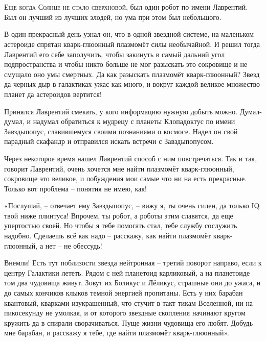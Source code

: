 \documentclass[ebook,oneside,final,openright]{memoir}
\begin{document}
\chapter{}
 \lettrine{Е}{ще когда Солнце не стало сверхновой,} был один робот по имени Лаврентий. Был он лучший из лучших злодей, но ума при этом был небольшого.\par
\par
В один прекрасный день узнал он, что в одной звездной системе, на маленьком астероиде спрятан кварк-глюонный плазмомёт силы необычайной. И решил тогда Лаврентий его себе заполучить, чтобы закинуть в самый дальний угол подпространства и чтобы никто больше не мог разыскать это сокровище и не смущало оно умы смертных. Да как разыскать плазмомёт кварк-глюонный? Звезд да черных дыр в галактиках ужас как много, и вокруг каждой великое множество планет да астероидов вертится!\par
\par
Принялся Лаврентий смекать, у кого информацию нужную добыть можно. Думал-думал, и надумал обратиться к мудрецу с планеты Клопадоктус по имени Завздыпопус, славившемуся своими познаниями о космосе. Надел он свой парадный скафандр и отправился искать встречи с Завздыпопусом.\par
\par
Через некоторое время нашел Лаврентий способ с ним повстречаться. Так и так, говорит Лаврентий, очень хочется мне найти плазмомёт кварк-глюонный, сокровище это великое, и побуждения мои самые что ни на есть прекрасные. Только вот проблема – понятия не имею, как!\par
\par
«Послушай, – отвечает ему Завздыпопус, – вижу я, ты очень силен, да только IQ твой ниже плинтуса! Впрочем, ты робот, а роботы этим славятся, да еще упертостью своей. Но чтобы я тебе помогать стал, тебе службу сослужить надобно. Сделаешь всё как надо – расскажу, как найти плазмомёт кварк-глюонный, а нет – не обессудь!\par
\par
Внемли! Есть тут поблизости звезда нейтронная – третий поворот направо, если к центру Галактики лететь. Рядом с ней планетоид карликовый, а на планетоиде том два чудовища живут. Зовут их Боликус и Лёликус, страшные они до ужаса, и до самых кончиков клыков темной энергией пропитаны. Есть у них барабан квантовый, кварками изукрашенный, что стучит в такт тикам Вселенной, ни на пикосекунду не умолкая, и от которого звездные скопления начинают кругом кружить да в спирали сворачиваться. Пуще жизни чудовища его любят. Добудь мне барабан, и расскажу я тебе, где найти плазмомёт кварк-глюонный».\par
\end{document}
